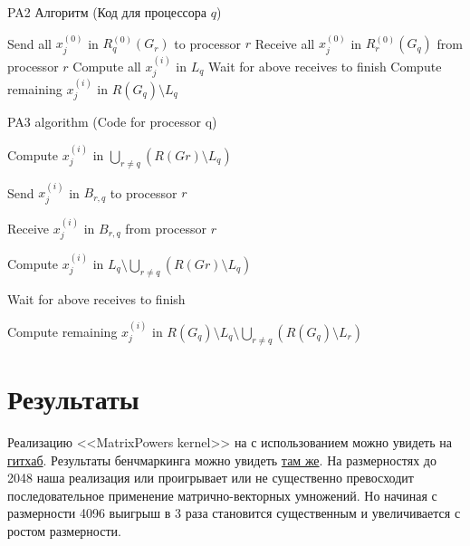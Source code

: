 \documentclass[a4paper,12pt]{report}
\begin{document}
    \begin{algorithm}
    \caption{PA2 Алгоритм (Код для процессора $q$)}
    \label{algo:segment}
    \begin{algorithmic}[1]
            \State Send all $x^{(0)}_j$ in $R^{(0)}_q(G_r)$ to processor $r$
        \EndFor
            \State Receive all $x^{(0)}_j$ in $R^{(0)}_r(G_q)$ from processor $r$
        \EndFor
            \State Compute all $x^{(i)}_j$ in $L_q$
        \EndFor
        \State Wait for above receives to finish
            \State Compute remaining $x^{(i)}_j$ in $R(G_q) \setminus L_q$
        \EndFor
    \end{algorithmic}
    \end{algorithm}

    \begin{algorithm}
    \caption{PA3 algorithm (Code for processor q)}
    \label{algo:PA2}
    \begin{algorithmic}[1]
            \State Compute $x^{(i)}_j$ in $\bigcup_{r \neq q} (R(Gr) \setminus L_q)$
        \EndFor
        
            \State Send $x^{(i)}_j$ in $B_{r,q}$ to processor $r$
        \EndFor
        
            \State Receive $x^{(i)}_j$ in $B_{r,q}$ from processor $r$
        \EndFor
        
            \State Compute $x^{(i)}_j$ in $L_q \setminus \bigcup_{r \neq q} (R(Gr) \setminus L_q)$ 
        \EndFor
        
        \State Wait for above receives to finish
        
            \State Compute remaining $x^{(i)}_j$ in $R(G_q) \setminus L_q \setminus \bigcup_{r \neq q} (R(G_q) \setminus L_r)$
        \EndFor
    \end{algorithmic}
    \end{algorithm}

    \chapter{ Результаты }
        Реализацию <<MatrixPowers kernel>> на  с использованием  можно увидеть на \href{https://github.com/ypodlesov/cmc-ctm-nla-methods/blob/master/basic_la/matrix_powers_mv.cpp}{гитхаб}. 
        Результаты бенчмаркинга можно увидеть \href{https://github.com/ypodlesov/cmc-ctm-nla-methods/tree/master/coursework_report}{там же}.
        На размерностях до 2048 наша реализация или проигрывает или не существенно превосходит последовательное применение матрично-векторных умножений. Но начиная с размерности 4096 выигрыш в 3 раза становится существенным и увеличивается с ростом размерности.
\end{document}
